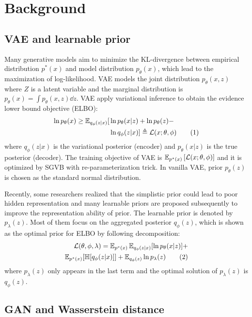 \section{Background}

\subsection{VAE and learnable prior}

Many generative models aim to minimize the KL-divergence between empirical distribution $p^*(x)$ and model distribution $p_\theta(x)$, which lead to the maximization of log-likelihood. VAE models the joint distribution $p_\theta(x, z)$ where $Z$ is a latent variable and the marginal distribution is $p_\theta(x) = \int p_\theta(x, z) \dd z$. VAE apply variational inference to obtain the evidence lower bound objective (ELBO): 
\begin{align*} \label{eq:ELBO}
\ln p_\theta(x) \geq \operatorname{\mathbb{E}}_{q_\phi(z|x)} [  &  \ln p_\theta(x|z) + \ln p_\theta(z) - \\ & \ln q_\phi(z|x) ] 
\triangleq \mathcal{L}(x; \theta, \phi) \tag{1}
\end{align*}
where $q_\phi(z|x)$ is the variational posterior (encoder) and $p_\theta(x|z)$ is the true posterior (decoder). The training objective of VAE is $\operatorname{\mathbb{E}}_{{p^*(x)}}\left[{\mathcal{L}(x; \theta, \phi)}\right]$ and it is optimized by SGVB with re-parameterization trick. In vanilla VAE, prior $p_\theta(z)$ is chosen as the standard normal distribution. 

Recently, some researchers realized that the simplistic prior could lead to poor hidden representation and many learnable priors are proposed subsequently to improve the representation ability of prior. The learnable prior is denoted by $p_\lambda(z)$. Most of them focus on the aggregated posterior $q_\phi(z)$, which is shown as the optimal prior for ELBO by following decomposition:
\begin{align*} \label{eq:second-decomposition}
\mathcal{L}(\theta, \phi, \lambda) = \operatorname{\mathbb{E}}_{p^*(x)}\operatorname{\mathbb{E}}_{q_\phi(z|x)} [ \ln p_\theta(x|z)] + \\ 
\operatorname{\mathbb{E}}_{p^*(x)}[\mathbb{H}[q_\phi(z|x)]] + \operatorname{\mathbb{E}}_{q_\phi(z)} \ln p_\lambda(z) \tag{2}
\end{align*}
where $p_\lambda(z)$ only appears in the last term and the optimal solution of $p_\lambda(z)$ is $q_\phi(z)$. 

\subsection{GAN and Wasserstein distance}


